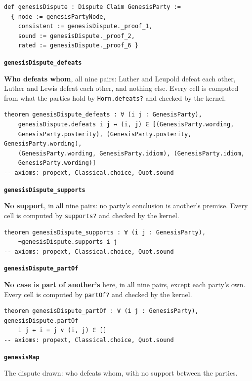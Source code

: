 \documentclass[11pt]{article}
\begin{document}
{\small\begin{verbatim}
def genesisDispute : Dispute Claim GenesisParty :=
  { node := genesisPartyNode,
    consistent := genesisDispute._proof_1,
    sound := genesisDispute._proof_2,
    rated := genesisDispute._proof_6 }
\end{verbatim}}
\par\medskip\noindent\textbf{\texttt{genesis\allowbreak{}Dispute\_\allowbreak{}defeats}}\par\nobreak\noindent
\textbf{Who defeats whom}, all nine pairs: Luther and Leupold defeat each other, Luther and Lewis defeat each other, and nothing else. Every cell is computed from what the parties hold by \texttt{Horn.defeats?} and checked by the kernel.

{\small\begin{verbatim}
theorem genesisDispute_defeats : ∀ (i j : GenesisParty),
    genesisDispute.defeats i j ↔ (i, j) ∈ [(GenesisParty.wording,
    GenesisParty.posterity), (GenesisParty.posterity, GenesisParty.wording),
    (GenesisParty.wording, GenesisParty.idiom), (GenesisParty.idiom,
    GenesisParty.wording)]
-- axioms: propext, Classical.choice, Quot.sound
\end{verbatim}}
\par\medskip\noindent\textbf{\texttt{genesis\allowbreak{}Dispute\_\allowbreak{}supports}}\par\nobreak\noindent
\textbf{No support}, in all nine pairs: no party’s conclusion is another’s premise. Every cell is computed by \texttt{supports?} and checked by the kernel.

{\small\begin{verbatim}
theorem genesisDispute_supports : ∀ (i j : GenesisParty),
    ¬genesisDispute.supports i j
-- axioms: propext, Classical.choice, Quot.sound
\end{verbatim}}
\par\medskip\noindent\textbf{\texttt{genesis\allowbreak{}Dispute\_\allowbreak{}part\allowbreak{}Of}}\par\nobreak\noindent
\textbf{No case is part of another’s} here, in all nine pairs, except each party’s own. Every cell is computed by \texttt{part\allowbreak{}Of?} and checked by the kernel.

{\small\begin{verbatim}
theorem genesisDispute_partOf : ∀ (i j : GenesisParty), genesisDispute.partOf
    i j ↔ i = j ∨ (i, j) ∈ []
-- axioms: propext, Classical.choice, Quot.sound
\end{verbatim}}
\par\medskip\noindent\textbf{\texttt{genesis\allowbreak{}Map}}\par\nobreak\noindent
The dispute drawn: who defeats whom, with no support between the parties.
\end{document}
